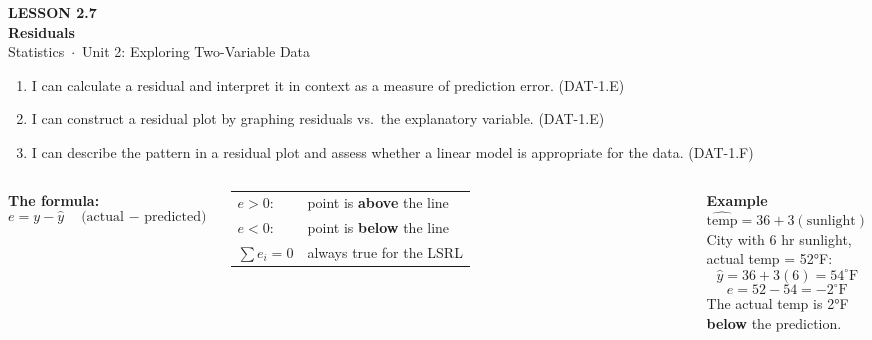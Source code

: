 \documentclass[aspectratio=169, 11pt]{beamer}
\begin{document}
{
\begin{frame}[plain]
  \vspace{2.8cm}\hspace{0.55cm}%
  \begin{minipage}{0.9\textwidth}
    {\color{goldacc}\bfseries\small LESSON 2.7}\\[0.5cm]
    {\color{white}\bfseries\LARGE Residuals}\\[1.2cm]
    {\color{skymid}\small Statistics~$\cdot$~Unit 2: Exploring Two-Variable Data}
  \end{minipage}
\end{frame}
}

\begin{frame}[t, plain]
  \begin{enumerate}
    \item I can calculate a residual and interpret it in context as a measure of prediction error.
          \hfill\textcolor{slate}{\small(DAT-1.E)}
    \bigskip
    \item I can construct a residual plot by graphing residuals vs.\ the explanatory variable.
          \hfill\textcolor{slate}{\small(DAT-1.E)}
    \bigskip
    \item I can describe the pattern in a residual plot and assess whether a linear model is
          appropriate for the data.
          \hfill\textcolor{slate}{\small(DAT-1.F)}
  \end{enumerate}
\end{frame}

\begin{frame}[t, plain]

  \begin{columns}[T]
      \textbf{The formula:}
      \[
        e = y - \hat{y} \quad \text{(actual $-$ predicted)}
      \]
      \bigskip
      \begin{tabular}{ll}
        $e > 0$: & point is \textbf{above} the line \\[4pt]
        $e < 0$: & point is \textbf{below} the line \\[4pt]
        $\sum e_i = 0$ & always true for the LSRL
      \end{tabular}

      \textbf{Example}\\[4pt]
      $\widehat{\text{temp}} = 36 + 3(\text{sunlight})$\\[6pt]
      City with 6 hr sunlight, actual temp = 52°F:
      \[
        \hat{y} = 36 + 3(6) = 54^\circ\text{F}
      \]
      \[
        e = 52 - 54 = -2^\circ\text{F}
      \]
      {\small The actual temp is 2°F \textbf{below} the prediction.}
  \end{columns}
\end{frame}
\end{document}
